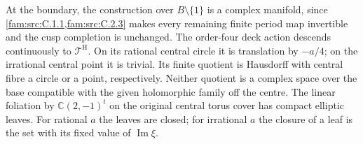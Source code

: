 \begin{proposition}\label{push:src:D.2.4}
At the boundary, the construction over \(B\setminus\{1\}\) is a
complex manifold, since \cref{fam:src:C.1.1,fam:src:C.2.3} makes every remaining finite period map
invertible and the cusp completion is unchanged.
The order-four deck action descends continuously to
\(\mathcal T^{\mathrm H}\). On its rational central circle it is
translation by \(-a/4\); on the irrational central point it is
trivial. Its finite quotient is Hausdorff with central fibre a circle
or a point, respectively. Neither quotient is a complex space over
the base compatible with the given holomorphic family off the centre.
The linear foliation by \(\mathbb C(2,-1)^t\) on the original central
torus cover has compact elliptic leaves. For rational \(a\) the
leaves are closed; for irrational \(a\) the closure of a leaf is the
set with its fixed value of \(\operatorname{Im}\xi\).
\end{proposition}

